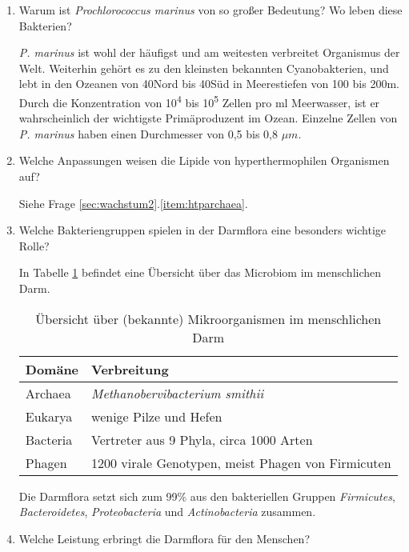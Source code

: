 \begin{enumerate}
	\item Warum ist \emph{Prochlorococcus marinus} von so großer Bedeutung? Wo leben diese Bakterien?

		\emph{P. marinus} ist wohl der häufigst und am weitesten verbreitet Organismus der Welt.
		Weiterhin gehört es zu den kleinsten bekannten Cyanobakterien, 
		und lebt in den Ozeanen von 40\textdegree Nord bis 40\textdegree Süd in Meerestiefen von 100 bis 200m.
		Durch die Konzentration von 10\textsuperscript{4} bis 10\textsuperscript{5} Zellen pro ml Meerwasser,
		ist er wahrscheinlich der wichtigste Primäproduzent im Ozean.
		Einzelne Zellen von \emph{P. marinus} haben einen Durchmesser von 0,5 bis 0,8 \begin{math}\mu m\end{math}.

	\item Welche Anpassungen weisen die Lipide von hyperthermophilen Organismen auf?

		Siehe Frage \ref{sec:wachstum2}.\ref{item:htparchaea}.

	\item Welche Bakteriengruppen spielen in der Darmflora eine besonders wichtige Rolle?
		
		In Tabelle \ref{tab:darmMO} befindet eine Übersicht über das Microbiom im menschlichen Darm.

		\begin{table}[h]
		\begin{center}
		\begin{tabular}{l l}
		\toprule
		Domäne		&		Verbreitung \\
		\midrule
		Archaea		&		\emph{Methanobervibacterium smithii}	\\
		Eukarya		&		wenige Pilze und Hefen 		\\
		Bacteria		&		Vertreter aus 9 Phyla, circa 1000 Arten 	\\
		Phagen		&		1200 virale Genotypen, meist Phagen von Firmicuten \\
		\bottomrule
		\end{tabular}
		\caption{Übersicht über (bekannte) Mikroorganismen im menschlichen Darm}
		\label{tab:darmMO}
		\end{center}
		\end{table}

		Die Darmflora setzt sich zum 99\% aus den bakteriellen Gruppen \emph{Firmicutes},
		\emph{Bacteroidetes}, \emph{Proteobacteria} und \emph{Actinobacteria} zusammen.		%

	\item Welche Leistung erbringt die Darmflora für den Menschen?
\end{enumerate}
